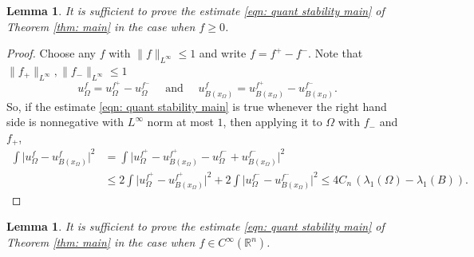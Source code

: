 \documentclass[10pt, reqno]{amsart}
\numberwithin{equation}{section}
\newtheorem{lemma}[theorem]{Lemma}
\def\R{{\mathbb R}}
\def\W{\Omega}
\begin{document}
 \begin{lemma} \label{l:fnonneg}
   It is sufficient to prove the estimate \eqref{eqn: quant stability main} of  Theorem \ref{thm: main} in the case when  $f \geq 0$. 
 \end{lemma}

 \begin{proof}
 Choose any $f$ with $\| f\|_{L^{\infty}} \leq 1$ and  write $f = f^+ - f^-$. Note that $\| f_+\|_{L^{\infty}}, \| f_-\|_{L^{\infty}} \leq 1$
   \[
   u_{\W}^f = u_{\W}^{f^+} - u_{\W}^{f^-} \quad \text{ and } \quad 
   u_{B(x_{\W})}^f = u_{B(x_{\W})}^{f^+} - u_{B(x_{\W})}^{f^-}. 
   \]
   So, if the estimate \eqref{eqn: quant stability main}  is true whenever the right hand side is nonnegative with $L^{\infty}$ norm at most $1$, then applying it to $\W$ with $f_-$ and $f_+$,
   \[
   \begin{aligned}
   \int \big|u_{\W}^f- u_{B(x_{\W})}^f \big|^2
   &= \int \big|u_{\W}^{f^+} - u_{B(x_{\W})}^{f^+} -u_{\W}^{f^-} + u_{B(x_{\W})}^{f^-}  \big|^2\\
   &\leq 2\int \big|u_{\W}^{f^+} - u_{B(x_{\W})}^{f^+} \big|^2
   + 2\int \big|u_{\W}^{f^-} - u_{B(x_{\W})}^{f^-} \big|^2\leq 4 C_{n}\, (\lambda_1(\W) - \lambda_1(B)). 
   \end{aligned}
   \]
 \end{proof}

\begin{lemma} \label{l:fsmooth}
 It is sufficient to prove  the estimate \eqref{eqn: quant stability main} of  Theorem \ref{thm: main} in the case when  $f \in C^{\infty}(\R^n)$. 
\end{lemma}
\end{document}
